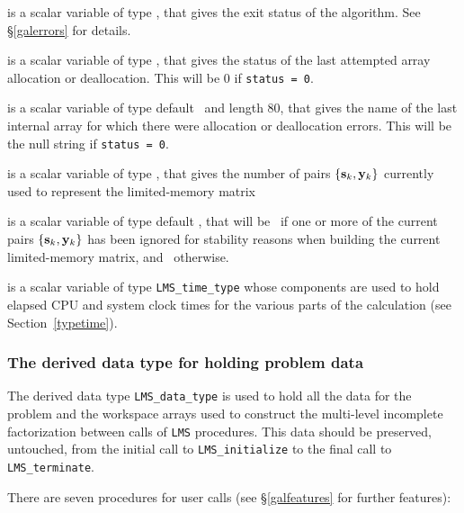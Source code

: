 \documentclass{galahad}
\newcommand{\packagename}{LMS}
\begin{document}
\begin{description}

 is a scalar variable of type \integer, that gives the
exit status of the algorithm.
See \S\ref{galerrors}
for details.

 is a scalar variable of type \integer, that gives
the status of the last attempted array allocation or deallocation.
This will be 0 if {\tt status = 0}.

 is a scalar variable of type default \character\
and length 80, that  gives the name of the last internal array
for which there were allocation or deallocation errors.
This will be the null string if {\tt status = 0}.

 is a scalar variable of type \integer, that
gives the number of pairs $\{{\mathbf{s}}_k,{\mathbf{y}}_k\}$ currently used to represent the
limited-memory matrix

 is a scalar variable of type default \logical, that
will be \true\ if one or more of the current pairs $\{{\mathbf{s}}_k,{\mathbf{y}}_k\}$ has
been ignored for stability reasons when building the current limited-memory
matrix, and \false\ otherwise.

 is a scalar variable of type {\tt \packagename\_time\_type}
whose components are used to hold elapsed CPU and system clock times for
the various parts of the calculation (see Section~\ref{typetime}).

\end{description}


\subsubsection{The derived data type for holding problem data}\label{typedata}
The derived data type
{\tt \packagename\_data\_type}
is used to hold all the data for the problem and the workspace arrays
used to construct the multi-level incomplete factorization between calls of
{\tt \packagename} procedures.
This data should be preserved, untouched, from the initial call to
{\tt \packagename\_initialize}
to the final call to
{\tt \packagename\_terminate}.


\galarguments
There are seven procedures for user calls
(see \S\ref{galfeatures} for further features):
\end{document}
